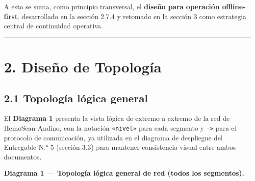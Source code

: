 \documentclass[11pt,a4paper]{article}
\begin{document}
A esto se suma, como principio transversal, el \textbf{diseño para operación offline-first}, desarrollado en la sección 2.7.4 y retomado en la sección 3 como estrategia central de continuidad operativa.

\begin{center}\rule{0.5\linewidth}{0.5pt}\end{center}

\section{2. Diseño de Topología}\label{diseuxf1o-de-topologuxeda}

\subsection{2.1 Topología lógica general}\label{topologuxeda-luxf3gica-general}

El \textbf{Diagrama 1} presenta la vista lógica de extremo a extremo de la red de HemoScan Andino, con la notación \texttt{«nivel»} para cada segmento y \texttt{-\textgreater{}} para el protocolo de comunicación, ya utilizada en el diagrama de despliegue del Entregable N.° 5 (sección 3.3) para mantener consistencia visual entre ambos documentos.

\textbf{Diagrama 1 --- Topología lógica general de red (todos los segmentos).}
\end{document}
